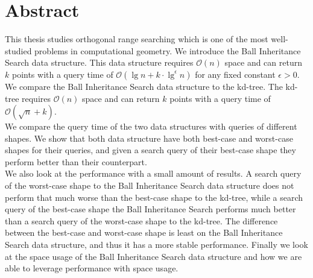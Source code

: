 \documentclass[twoside,11pt,openright]{report}
\begin{document}
\pagestyle{empty} 
\vspace*{\fill}
\clearpage


\pagestyle{plain}
\chapter*{Abstract}

This thesis studies orthogonal range searching which is one of the most well-studied problems in computational geometry. We introduce the Ball Inheritance Search data structure. This data structure requires $\mathcal{O}(n)$ space and can return $k$ points with a query time of $\mathcal{O}(\lg n + k\cdot\lg^\epsilon n)$ for any fixed constant $\epsilon > 0$. We compare the Ball Inheritance Search data structure to the kd-tree. The kd-tree requires $\mathcal{O}(n)$ space and can return $k$ points with a query time of $\mathcal{O}(\sqrt{n} + k)$.\\

We compare the query time of the two data structures with queries of different shapes. We show that both data structure have both best-case and worst-case shapes for their queries, and given a search query of their best-case shape they perform better than their counterpart.\\

We also look at the performance with a small amount of results. A search query of the worst-case shape to the Ball Inheritance Search data structure does not perform that much worse than the best-case shape to the kd-tree, while a search query of the best-case shape the Ball Inheritance Search performs much better than a search query of the worst-case shape to the kd-tree. The difference between the best-case and worst-case shape is least on the Ball Inheritance Search data structure, and thus it has a more stable performance. Finally we look at the space usage of the Ball Inheritance Search data structure and how we are able to leverage performance with space usage.
\end{document}
